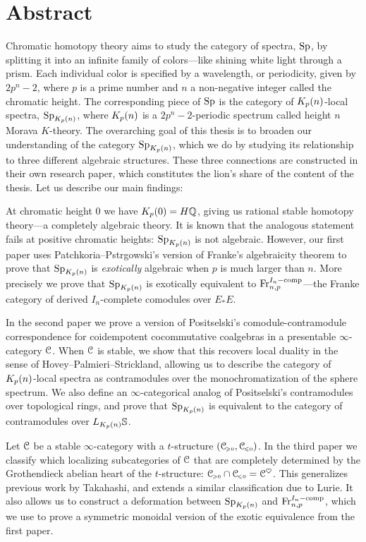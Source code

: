 

\section*{Abstract}

Chromatic homotopy theory aims to study the category of spectra, $\mathrm{Sp}$, by splitting it into an infinite family of colors---like shining white light through a prism. Each individual color is specified by a wavelength, or periodicity, given by $2p^n-2$, where $p$ is a prime number and $n$ a non-negative integer called the chromatic height. The corresponding piece of $\mathrm{Sp}$ is the category of ${K_p(n)}$-local spectra, $\mathrm{Sp}_{K_p(n)}$, where ${K_p(n)}$ is a $2p^n-2$-periodic spectrum called height $n$ Morava $K$-theory. The overarching goal of this thesis is to broaden our understanding of the category $\mathrm{Sp}_{K_p(n)}$, which we do by studying its relationship to three different algebraic structures. These three connections are constructed in their own research paper, which constitutes the lion's share of the content of the thesis. Let us describe our main findings:

At chromatic height $0$ we have $K_p(0) = H\mathbb{Q}$, giving us rational stable homotopy theory---a completely algebraic theory. It is known that the analogous statement fails at positive chromatic heights: $\mathrm{Sp}_{K_p(n)}$ is not algebraic. However, our first paper uses Patchkoria--Pstr\a{}gowski's version of Franke's algebraicity theorem to prove that $\mathrm{Sp}_{K_p(n)}$ is \emph{exotically} algebraic when $p$ is much larger than $n$. More precisely we prove that $\mathrm{Sp}_{K_p(n)}$ is exotically equivalent to $\mathrm{Fr}_{n,p}^{I_n-\mathrm{comp}}$---the Franke category of derived $I_n$-complete comodules over $E_*E$. 

In the second paper we prove a version of Positselski's comodule-contramodule correspondence for coidempotent cocommutative coalgebras in a presentable $\infty$-category $\EuScript{C}$. When $\EuScript{C}$ is stable, we show that this recovers local duality in the sense of Hovey--Palmieri--Strickland, allowing us to describe the category of ${K_p(n)}$-local spectra as contramodules over the monochromatization of the sphere spectrum. We also define an $\infty$-categorical analog of Positselski's contramodules over topological rings, and prove that $\mathrm{Sp}_{K_p(n)}$ is equivalent to the category of contramodules over $L_{K_p(n)} \mathbb{S}$. 

Let $\EuScript{C}$ be a stable $\infty$-category with a $t$-structure $(\EuScript{C}_{\hspace{-1pt}\scriptscriptstyle\geqslant 0}, \EuScript{C}_{\hspace{-1pt}\scriptscriptstyle\leqslant 0})$. In the third paper we classify which localizing subcategories of $\EuScript{C}$ that are completely determined by the Grothendieck abelian heart of the $t$-structure: $\EuScript{C}_{\hspace{-1pt}\scriptscriptstyle\geqslant 0} \cap \EuScript{C}_{\hspace{-1pt}\scriptscriptstyle\leqslant 0} = \EuScript{C}^\heartsuit$. This generalizes previous work by Takahashi, and extends a similar classification due to Lurie. It also allows us to construct a deformation between $\mathrm{Sp}_{K_p(n)}$ and $\mathrm{Fr}_{n,p}^{I_n-\mathrm{comp}}$, which we use to prove a symmetric monoidal version of the exotic equivalence from the first paper. 





